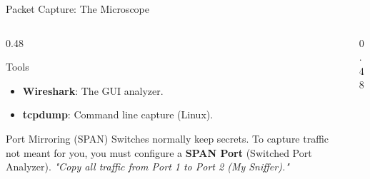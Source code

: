 \documentclass[aspectratio=169]{beamer}  %
\begin{document}
\begin{frame}{Packet Capture: The Microscope}
    \begin{columns}[T]
        \begin{column}{0.48\textwidth}
            \begin{block}{Tools}
                \footnotesize
                \begin{itemize}
                    \item \textbf{Wireshark}: The GUI analyzer.
                    \item \textbf{tcpdump}: Command line capture (Linux).
                \end{itemize}
            \end{block}
            \begin{alertblock}{Port Mirroring (SPAN)}
                \footnotesize
                Switches normally keep secrets. To capture traffic not meant for you, you must configure a \textbf{SPAN Port} (Switched Port Analyzer).
                \textit{"Copy all traffic from Port 1 to Port 2 (My Sniffer)."}
            \end{alertblock}
        \end{column}
        \begin{column}{0.48\textwidth}
            \begin{center}
            \end{center}
        \end{column}
    \end{columns}
\end{frame}
\end{document}
